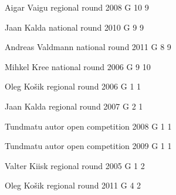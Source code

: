 \documentclass[11pt]{article}
\begin{document}
\ylDisplay{} %
{Aigar Vaigu} %
{regional round} %
{2008} %
{G 10} %
{9} %
{

\ifEngSolution
\fi
}

\ylDisplay{} %
{Jaan Kalda} %
{national round} %
{2010} %
{G 9} %
{9} %
{

\ifEngSolution
\fi
}

\ylDisplay{} %
{Andreas Valdmann} %
{national round} %
{2011} %
{G 8} %
{9} %
{

\ifEngSolution
\fi
}

\ylDisplay{} %
{Mihkel Kree} %
{national round} %
{2006} %
{G 9} %
{10} %
{

\ifEngSolution
\fi
}

\ylDisplay{} %
{Oleg Košik} %
{regional round} %
{2006} %
{G 1} %
{1} %
{

\ifEngSolution
\fi
}

\ylDisplay{} %
{Jaan Kalda} %
{regional round} %
{2007} %
{G 2} %
{1} %
{

\ifEngSolution
\fi
}

\ylDisplay{} %
{Tundmatu autor} %
{open competition} %
{2008} %
{G 1} %
{1} %
{

\ifEngSolution
\fi
}

\ylDisplay{} %
{Tundmatu autor} %
{open competition} %
{2009} %
{G 1} %
{1} %
{

\ifEngSolution
\fi
}

\ylDisplay{} %
{Valter Kiisk} %
{regional round} %
{2005} %
{G 1} %
{2} %
{

\ifEngSolution
\fi
}

\ylDisplay{} %
{Oleg Košik} %
{regional round} %
{2011} %
{G 4} %
{2} %
{

\ifEngSolution
\fi
}
\end{document}
